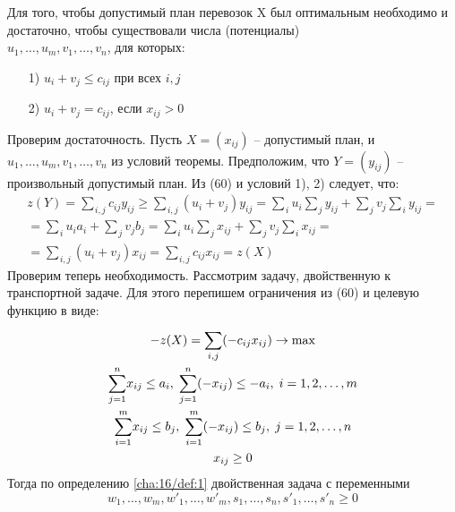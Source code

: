 \begin{theorem}[]\label{cha:20/the:1}
	Для того, чтобы допустимый план перевозок X был оптимальным необходимо и достаточно, чтобы существовали числа (потенциалы) \\ $u_1, \dots, u_m, v_1, \dots, v_n$, для которых:
	\begin{itemize}
		\item[1)] $u_i + v_j \le c_{ij}$ при всех $i, j$
		\item[2)] $u_i + v_j = c_{ij}$, если $x_{ij} > 0$
	\end{itemize}
\end{theorem}
\begin{Proof}
	Проверим достаточность. Пусть $X = (x_{ij})$ – допустимый план, и $u_1, \dots, u_m, v_1, \dots, v_n$ из условий теоремы. Предположим, что $Y = (y_{ij})$ – произвольный допустимый план. Из (60) и условий 1), 2) следует, что:
	$$\begin{gathered}
		z(Y) = \underset{i, j}{\overset{}{\sum}}c_{ij} y_{ij} \ge \underset{i, j}{\overset{}{\sum}}(u_i + v_j) y_{ij} = \underset{i}{\overset{}{\sum}}u_i \underset{j}{\overset{}{\sum}}y_{ij} + \underset{j}{\overset{}{\sum}}v_j \underset{i}{\overset{}{\sum}}y_{ij} = \\
		= \underset{i}{\overset{}{\sum}}u_i a_i + \underset{j}{\overset{}{\sum}}v_j b_j = \underset{i}{\overset{}{\sum}}u_i \underset{j}{\overset{}{\sum}}x_{ij} + \underset{j}{\overset{}{\sum}}v_j \underset{i}{\overset{}{\sum}}x_{ij} = \\
		= \underset{i, j}{\overset{}{\sum}}(u_i + v_j) x_{ij} = \underset{i, j}{\overset{}{\sum}}c_{ij} x_{ij} = z(X)
	\end{gathered}$$
	Проверим теперь необходимость. Рассмотрим задачу, двойственную к транспортной задаче. Для этого перепишем ограничения из (60) и целевую функцию в виде:
	$$\begin{gathered}
		-z(X) = \underset{i, j}{\overset{}{\sum}}(-c_{ij}x_{ij}) \to \max \\
		\underset{j=1}{\overset{n}{\sum}}x_{ij} \le a_i, \; \underset{j=1}{\overset{n}{\sum}}(-x_{ij}) \le -a_i, \; i = 1,2,\dots,m \\
		\underset{i=1}{\overset{m}{\sum}}x_{ij} \le b_j, \; \underset{i=1}{\overset{m}{\sum}}(-x_{ij}) \le b_j, \; j = 1,2,\dots,n \\
		x_{ij} \ge 0
	\end{gathered}$$
	Тогда по определению \ref{cha:16/def:1} двойственная задача с переменными
	$$w_1, \dots, w_m, w'_1, \dots, w'_m, s_1, \dots, s_n, s'_1, \dots, s'_n \ge 0$$

\end{Proof}
